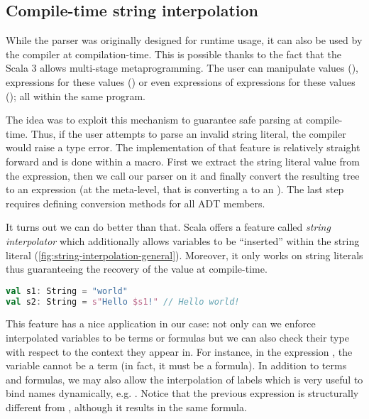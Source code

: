 \subsection{Compile-time string interpolation}
\label{sec:parsing-printing-string-interpolation}

While the parser was originally designed for runtime usage, it can also be used by the compiler at compilation-time. This is possible thanks to the fact that the Scala 3 allows multi-stage metaprogramming. The user can manipulate values (), expressions for these values () or even expressions of expressions for these values (); all within the same program.

The idea was to exploit this mechanism to guarantee safe parsing at compile-time. Thus, if the user attempts to parse an invalid string literal, the compiler would raise a type error. The implementation of that feature is relatively straight forward and is done within a macro. First we extract the string literal value from the expression, then we call our parser on it and finally convert the resulting tree to an expression (at the meta-level, that is converting a  to an ). The last step requires defining conversion methods for all ADT members.

It turns out we can do better than that. Scala offers a feature called \textit{string interpolator} which additionally allows variables to be ``inserted'' within the string literal (\autoref{fig:string-interpolation-general}). Moreover, it only works on string literals thus guaranteeing the recovery of the value at compile-time.

\begin{lstlisting}[language=Scala,caption={[String interpolation general example]{Simple demonstration of the string interpolation mechanism in Scala. The \code{s} interpolator simply calls \code{toString} on each variable passed and concatenates all the parts together.}},label={fig:string-interpolation-general},captionpos=b]
val s1: String = "world"
val s2: String = s"Hello $s1!" // Hello world!
\end{lstlisting}

This feature has a nice application in our case: not only can we enforce interpolated variables to be terms or formulas but we can also check their type with respect to the context they appear in. For instance, in the expression , the variable  cannot be a term (in fact, it must be a formula). In addition to terms and formulas, we may also allow the interpolation of labels which is very useful to bind names dynamically, e.g. . Notice that the previous expression is structurally different from , although it results in the same formula.

